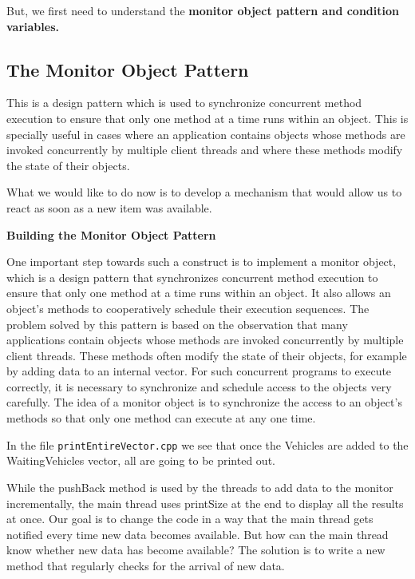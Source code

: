 \documentclass[11pt, a4paper]{article}
\begin{document}
But, we first need to understand the \textbf{monitor object pattern and condition variables.}


\subsection{The Monitor Object Pattern}%
\label{sub:the_monitor_object_pattern}

This is a design pattern which is used to synchronize concurrent method execution to ensure that only one method at a time runs within an object. This is specially useful in cases where an application contains objects whose methods are invoked concurrently by multiple client threads and where these methods modify the state of their objects. 


What we would like to do now is to develop a mechanism that would allow us to react as soon as a new item was available. 



\textbf{Building the Monitor Object Pattern}

One important step towards such a construct is to implement a monitor object, which is a design pattern that synchronizes concurrent method execution to ensure that only one method at a time runs within an object. It also allows an object's methods to cooperatively schedule their execution sequences. The problem solved by this pattern is based on the observation that many applications contain objects whose methods are invoked concurrently by multiple client threads. These methods often modify the state of their objects, for example by adding data to an internal vector. For such concurrent programs to execute correctly, it is necessary to synchronize and schedule access to the objects very carefully. The idea of a monitor object is to synchronize the access to an object's methods so that only one method can execute at any one time.


In the file \texttt{printEntireVector.cpp}  we see that once the Vehicles are added to the WaitingVehicles vector, all are going to be printed out. 

While the pushBack method is used by the threads to add data to the monitor incrementally, the main thread uses printSize at the end to display all the results at once. Our goal is to change the code in a way that the main thread gets notified every time new data becomes available. But how can the main thread know whether new data has become available? The solution is to write a new method that regularly checks for the arrival of new data.
\end{document}
